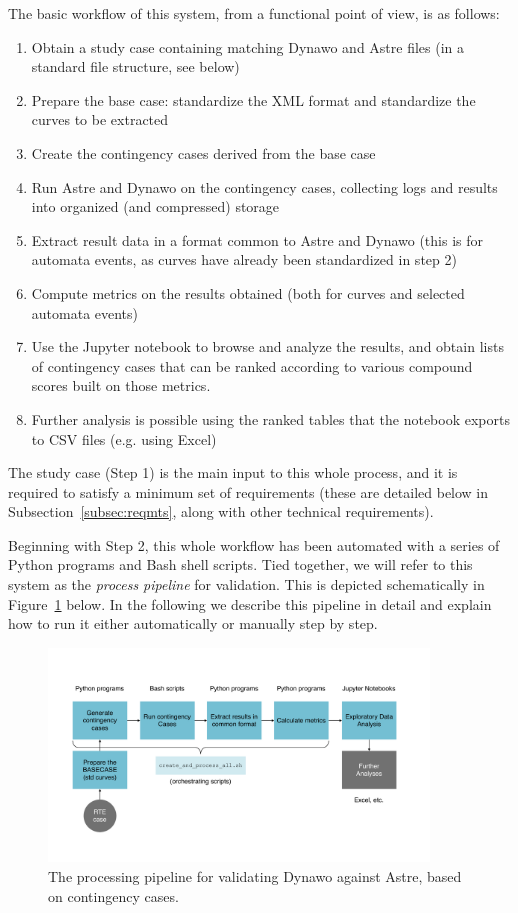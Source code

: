 \documentclass[11pt, a4paper, twoside, titlepage]{article}
\begin{document}
The basic workflow of this system, from a functional point of view, is
as follows:
\begin{enumerate}
  \item Obtain a study case containing matching Dynawo and Astre files
    (in a standard file structure, see below)
  \item Prepare the base case: standardize the XML format and
    standardize the curves to be extracted
  \item Create the contingency cases derived from the base case
  \item Run Astre and Dynawo on the contingency cases, collecting logs
    and results into organized (and compressed) storage 
  \item Extract result data in a format common to Astre and Dynawo
    (this is for automata events, as curves have already been
    standardized in step 2)
  \item Compute metrics on the results obtained (both for curves and
    selected automata events)
  \item Use the Jupyter notebook to browse and analyze the results,
    and obtain lists of contingency cases that can be ranked according
    to various compound scores built on those metrics.
  \item Further analysis is possible using the ranked tables that the
    notebook exports to CSV files (e.g. using Excel)    
\end{enumerate}

The study case (Step 1) is the main input to this whole process, and
it is required to satisfy a minimum set of requirements (these are
detailed below in Subsection~\ref{subsec:reqmts}, along with other
technical requirements).

Beginning with Step 2, this whole workflow has been automated with a
series of Python programs and Bash shell scripts. Tied together, we
will refer to this system as the \emph{process pipeline} for
validation. This is depicted schematically in
Figure~\ref{fig:pipeline1} below.  In the following we describe this
pipeline in detail and explain how to run it either automatically or
manually step by step.

\begin{figure}
  \centering
  \includegraphics[width=0.9\textwidth]{figs/pipeline1}
  \caption{The processing pipeline for validating Dynawo against
    Astre, based on contingency cases.}
  \label{fig:pipeline1}
\end{figure}
\end{document}
